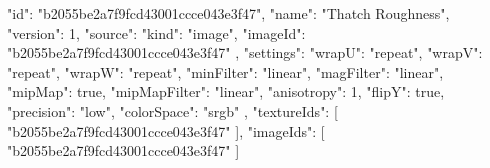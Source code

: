 {
  "id": "b2055be2a7f9fcd43001ccce043e3f47",
  "name": "Thatch Roughness",
  "version": 1,
  "source": {
    "kind": "image",
    "imageId": "b2055be2a7f9fcd43001ccce043e3f47"
  },
  "settings": {
    "wrapU": "repeat",
    "wrapV": "repeat",
    "wrapW": "repeat",
    "minFilter": "linear",
    "magFilter": "linear",
    "mipMap": true,
    "mipMapFilter": "linear",
    "anisotropy": 1,
    "flipY": true,
    "precision": "low",
    "colorSpace": "srgb"
  },
  "textureIds": [
    "b2055be2a7f9fcd43001ccce043e3f47"
  ],
  "imageIds": [
    "b2055be2a7f9fcd43001ccce043e3f47"
  ]
}
